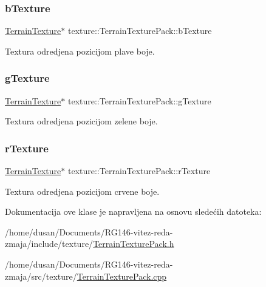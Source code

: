 \subsubsection{\texorpdfstring{b\+Texture}{bTexture}}
{\footnotesize\ttfamily \hyperlink{classtexture_1_1TerrainTexture}{Terrain\+Texture}$\ast$ texture\+::\+Terrain\+Texture\+Pack\+::b\+Texture\hspace{0.3cm}{\ttfamily [private]}}



Textura odredjena pozicijom plave boje. 

\mbox{\label{classtexture_1_1TerrainTexturePack_aee84140926644080ce963c6ffe5288da}} 
\subsubsection{\texorpdfstring{g\+Texture}{gTexture}}
{\footnotesize\ttfamily \hyperlink{classtexture_1_1TerrainTexture}{Terrain\+Texture}$\ast$ texture\+::\+Terrain\+Texture\+Pack\+::g\+Texture\hspace{0.3cm}{\ttfamily [private]}}



Textura odredjena pozicijom zelene boje. 

\mbox{\label{classtexture_1_1TerrainTexturePack_a08b5f1b7665151358b6b162627fc37d4}} 
\subsubsection{\texorpdfstring{r\+Texture}{rTexture}}
{\footnotesize\ttfamily \hyperlink{classtexture_1_1TerrainTexture}{Terrain\+Texture}$\ast$ texture\+::\+Terrain\+Texture\+Pack\+::r\+Texture\hspace{0.3cm}{\ttfamily [private]}}



Textura odredjena pozicijom crvene boje. 



Dokumentacija ove klase je napravljena na osnovu sledećih datoteka\+:\begin{DoxyCompactItemize}
\item 
/home/dusan/\+Documents/\+R\+G146-\/vitez-\/reda-\/zmaja/include/texture/\hyperlink{TerrainTexturePack_8h}{Terrain\+Texture\+Pack.\+h}\item 
/home/dusan/\+Documents/\+R\+G146-\/vitez-\/reda-\/zmaja/src/texture/\hyperlink{TerrainTexturePack_8cpp}{Terrain\+Texture\+Pack.\+cpp}\end{DoxyCompactItemize}
